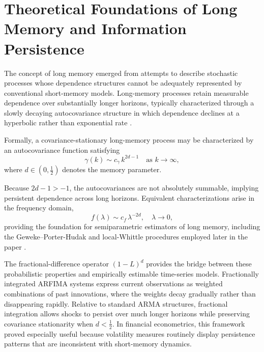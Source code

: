 \documentclass[unnumsec,webpdf,contemporary,large]{oup-authoring-template}%
\theoremstyle{thmstyleone}%
\theoremstyle{thmstyletwo}%
\theoremstyle{thmstylethree}%
\begin{document}
\section{Theoretical Foundations of Long Memory and Information
Persistence}
\label{sec:theory}

The concept of long memory emerged from attempts to describe stochastic
processes whose dependence structures cannot be adequately represented by
conventional short-memory models. Long-memory processes retain measurable
dependence over substantially longer horizons, typically characterized
through a slowly decaying autocovariance structure in which dependence
declines at a hyperbolic rather than exponential rate
\citep{granger1980introduction,hosking1981fractional}.

Formally, a covariance-stationary long-memory process may be characterized
by an autocovariance function satisfying
\begin{equation}
  \gamma(k) \sim c_\gamma\, k^{2d-1}\quad \text{as } k\to\infty,
  \label{eq:lm-autocov}
\end{equation}
where $d\in(0,\frac{1}{2})$ denotes the memory parameter.

Because $2d-1>-1$,
the autocovariances are not absolutely summable, implying persistent
dependence across long horizons. Equivalent characterizations arise in the
frequency domain,
\begin{equation}
  f(\lambda) \sim c_f\, \lambda^{-2d}, \quad \lambda \to 0,
\end{equation}
providing the foundation for semiparametric estimators of long memory,
including the Geweke--Porter-Hudak and local-Whittle procedures employed
later in the paper \citep{robinson1995gaussian}.

The fractional-difference operator $(1-L)^d$ provides the bridge between
these probabilistic properties and empirically estimable time-series models.
Fractionally integrated ARFIMA systems express current observations as
weighted combinations of past innovations, where the weights decay gradually
rather than disappearing rapidly. Relative to standard ARMA structures,
fractional integration allows shocks to persist over much longer horizons
while preserving covariance stationarity when $d<\frac{1}{2}$. In financial
econometrics, this framework proved especially useful because volatility
measures routinely display persistence patterns that are inconsistent with
short-memory dynamics.
\end{document}

